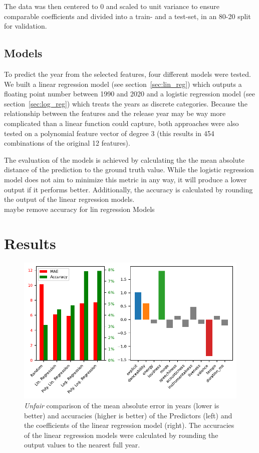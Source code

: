\documentclass{article}
\begin{document}
The data was then centered to 0 and scaled to unit variance to ensure comparable coefficients and divided into a train- and a test-set, in an 80-20 split for validation.

\subsection{Models}

To predict the year from the selected features, four different models were tested. We built a linear regression model (see section~\ref{sec:lin_reg}) which outputs a floating point number between 1990 and 2020 and a logistic regression model (see section~\ref{sec:log_reg}) which treats the years as discrete categories. Because the relationship between the features and the release year may be way more complicated than a linear function could capture, both approaches were also tested on a polynomial feature vector of degree 3 (this results in 454 combinations of the original 12 features). 

The evaluation of the models is achieved by calculating the the mean absolute distance of the prediction to the ground truth value. While the logistic regression model does not aim to minimize this metric in any way, it will produce a lower output if it performs better. Additionally, the accuracy is calculated by rounding the output of the linear regression models. \\\answerTODO maybe remove accuracy for lin regression Models

\section{Results}
\begin{figure}[t]
  \centering
  \includegraphics{losses_lincoefs}
  \caption{\emph{Unfair} comparison of the mean absolute error in years (lower is better) and accuracies (higher is better) of the Predictors (left) and the coefficients of the linear regression model (right). The accuracies of the linear regression models were calculated by rounding the output values to the nearest full year.}
  \label{fig:losses_lincoefs}
\end{figure}
\end{document}
